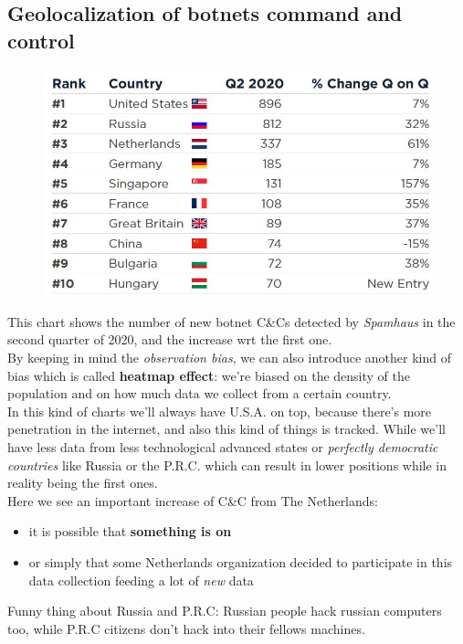     \subsection{Geolocalization of botnets command and control}
        \begin{figure}[ht!]
            \centering
            \includegraphics[width=0.6\linewidth]{chart.png}
        \end{figure}
        This chart shows the number of new botnet C\&Cs detected by \textit{Spamhaus} in the second quarter of 2020, and the increase wrt the first one.\\
        By keeping in mind the \textit{observation bias}, we can also introduce another kind of bias which is called \textbf{heatmap effect}: we're biased on the density of the population and on how much data we collect from a certain country.\\
        In this kind of charts we'll always have U.S.A. on top, because there's more penetration in the internet, and also this kind of things is tracked. While we'll have less data from less technological advanced states or \textit{perfectly democratic countries} like Russia or the P.R.C. which can result in lower positions while in reality being the first ones.\\
        Here we see an important increase of C\&C from The Netherlands:
        \begin{itemize}
            \item it is possible that \textbf{something is on}
            \item or simply that some Netherlands organization decided to participate in this data collection feeding a lot of \textit{new} data
        \end{itemize}
        Funny thing about Russia and P.R.C: Russian people hack russian computers too, while P.R.C citizens don't hack into their fellows machines.
\newpage
